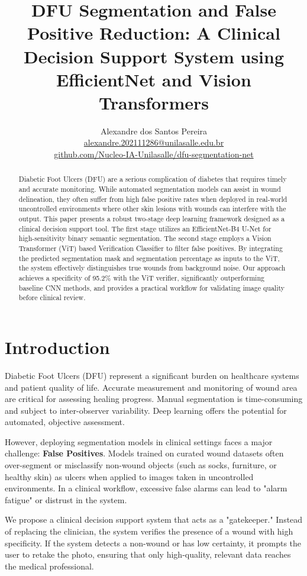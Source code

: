 \documentclass{article}
\title{DFU Segmentation and False Positive Reduction: A Clinical Decision Support System using EfficientNet and Vision Transformers}
\author{
  Alexandre dos Santos Pereira \\
  \href{mailto:alexandre.202111286@unilasalle.edu.br}{alexandre.202111286@unilasalle.edu.br} \\
  \href{https://github.com/Nucleo-IA-Unilasalle/dfu-segmentation-net}{github.com/Nucleo-IA-Unilasalle/dfu-segmentation-net} \\
}
\begin{document}
\maketitle

\begin{abstract}
Diabetic Foot Ulcers (DFU) are a serious complication of diabetes that requires timely and accurate monitoring. While automated segmentation models can assist in wound delineation, they often suffer from high false positive rates when deployed in real-world uncontrolled environments where other skin lesions with wounds can interfere with the output. This paper presents a robust two-stage deep learning framework designed as a clinical decision support tool. The first stage utilizes an EfficientNet-B4 U-Net for high-sensitivity binary semantic segmentation. The second stage employs a Vision Transformer (ViT) based Verification Classifier to filter false positives. By integrating the predicted segmentation mask and segmentation percentage as inputs to the ViT, the system effectively distinguishes true wounds from background noise. Our approach achieves a specificity of 95.2\% with the ViT verifier, significantly outperforming baseline CNN methods, and provides a practical workflow for validating image quality before clinical review.
\end{abstract}

\section{Introduction}
Diabetic Foot Ulcers (DFU) represent a significant burden on healthcare systems and patient quality of life. Accurate measurement and monitoring of wound area are critical for assessing healing progress. Manual segmentation is time-consuming and subject to inter-observer variability. Deep learning offers the potential for automated, objective assessment.

However, deploying segmentation models in clinical settings faces a major challenge: \textbf{False Positives}. Models trained on curated wound datasets often over-segment or misclassify non-wound objects (such as socks, furniture, or healthy skin) as ulcers when applied to images taken in uncontrolled environments. In a clinical workflow, excessive false alarms can lead to "alarm fatigue" or distrust in the system.

We propose a clinical decision support system that acts as a "gatekeeper." Instead of replacing the clinician, the system verifies the presence of a wound with high specificity. If the system detects a non-wound or has low certainty, it prompts the user to retake the photo, ensuring that only high-quality, relevant data reaches the medical professional.
\end{document}

